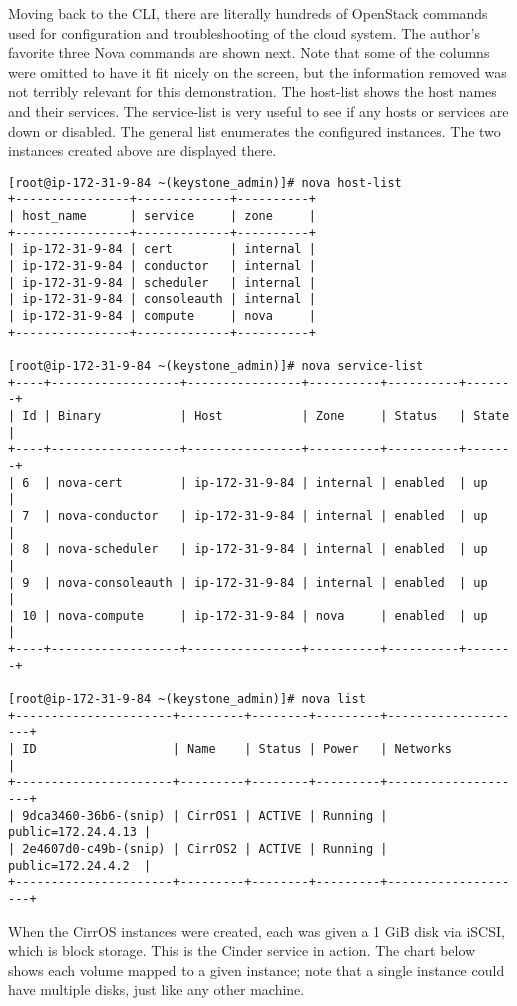 Moving back to the CLI, there are literally hundreds of OpenStack commands
used for configuration and troubleshooting of the cloud system. The author’s
favorite three Nova commands are shown next. Note that some
of the columns were omitted to have it fit nicely on the screen, but the
information removed was not terribly relevant for this demonstration. The
host-list shows the host names and their services. The service-list is very
useful to see if any hosts or services are down or disabled. The general list
enumerates the configured instances. The two instances created above are
displayed there.

\begin{verbatim}
[root@ip-172-31-9-84 ~(keystone_admin)]# nova host-list
+----------------+-------------+----------+
| host_name      | service     | zone     |
+----------------+-------------+----------+
| ip-172-31-9-84 | cert        | internal |
| ip-172-31-9-84 | conductor   | internal |
| ip-172-31-9-84 | scheduler   | internal |
| ip-172-31-9-84 | consoleauth | internal |
| ip-172-31-9-84 | compute     | nova     |
+----------------+-------------+----------+

[root@ip-172-31-9-84 ~(keystone_admin)]# nova service-list
+----+------------------+----------------+----------+----------+-------+
| Id | Binary           | Host           | Zone     | Status   | State |
+----+------------------+----------------+----------+----------+-------+
| 6  | nova-cert        | ip-172-31-9-84 | internal | enabled  | up    |
| 7  | nova-conductor   | ip-172-31-9-84 | internal | enabled  | up    |
| 8  | nova-scheduler   | ip-172-31-9-84 | internal | enabled  | up    |
| 9  | nova-consoleauth | ip-172-31-9-84 | internal | enabled  | up    |
| 10 | nova-compute     | ip-172-31-9-84 | nova     | enabled  | up    |
+----+------------------+----------------+----------+----------+-------+

[root@ip-172-31-9-84 ~(keystone_admin)]# nova list
+----------------------+---------+--------+---------+--------------------+
| ID                   | Name    | Status | Power   | Networks           |
+----------------------+---------+--------+---------+--------------------+
| 9dca3460-36b6-(snip) | CirrOS1 | ACTIVE | Running | public=172.24.4.13 |
| 2e4607d0-c49b-(snip) | CirrOS2 | ACTIVE | Running | public=172.24.4.2  |
+----------------------+---------+--------+---------+--------------------+
\end{verbatim}

When the CirrOS instances were created, each was given a 1 GiB disk via iSCSI,
which is block storage. This is the Cinder service in action. The chart below
shows each volume mapped to a given instance; note that a single instance
could have multiple disks, just like any other machine.

